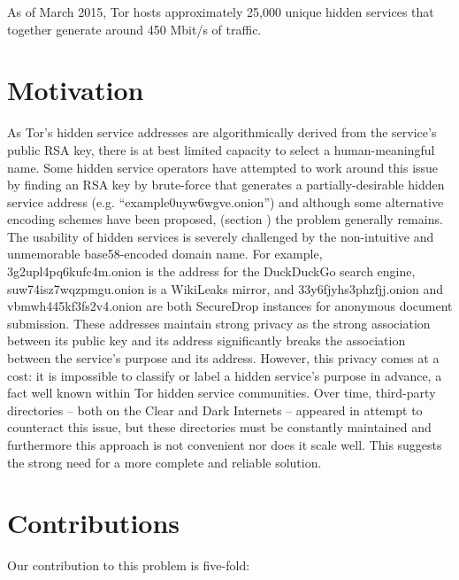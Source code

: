 As of March 2015, Tor hosts approximately 25,000 unique hidden services that together generate around 450 Mbit/s of traffic.\cite{TorMetrics}

\section{Motivation}
\label{sec:Motivation}

As Tor's hidden service addresses are algorithmically derived from the service's public RSA key, there is at best limited capacity to select a human-meaningful name. Some hidden service operators have attempted to work around this issue by finding an RSA key by brute-force that generates a partially-desirable hidden service address (e.g. ``example0uyw6wgve.onion'') and although some alternative encoding schemes have been proposed, (section \label{sec:EncodingSchemes}) the problem generally remains. The usability of hidden services is severely challenged by the non-intuitive and unmemorable base58-encoded domain name. For example, 3g2upl4pq6kufc4m.onion is the address for the DuckDuckGo search engine, \\ suw74isz7wqzpmgu.onion is a WikiLeaks mirror, and 33y6fjyhs3phzfjj.onion and \\ vbmwh445kf3fs2v4.onion are both SecureDrop instances for anonymous document submission. These addresses maintain strong privacy as the strong association between its public key and its address significantly breaks the association between the service's purpose and its address. However, this privacy comes at a cost: it is impossible to classify or label a hidden service's purpose in advance, a fact well known within Tor hidden service communities. Over time, third-party directories -- both on the Clear and Dark Internets -- appeared in attempt to counteract this issue, but these directories must be constantly maintained and furthermore this approach is not convenient nor does it scale well. This suggests the strong need for a more complete and reliable solution.

\section{Contributions}

Our contribution to this problem is five-fold:

